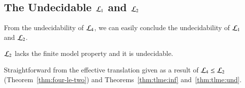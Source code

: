 \begin{pf}
%
%
%
\end{pf}

\subsection{The Undecidable $\mathcal{L}_1$ and $\mathcal{L}_2$}

From the undecidability of $\mathcal{L}_4$, we can easily conclude the
undecidability of $\mathcal{L}_1$ and $\mathcal{L}_2$.

\begin{thm}
$\mathcal{L}_2$ lacks the finite model property and it is undecidable.
\end{thm}

\begin{pf}
Straightforward from the effective translation given as a result of
$\mathcal{L}_4 \leq \mathcal{L}_2$ (Theorem~\ref{thm:four-le-two}) and
Theorems~\ref{thm:tlme:inf} and~\ref{thm:tlme:und}.
\end{pf}

